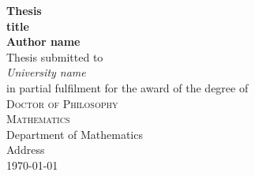\begin{titlepage}

\begin{center}
  {\huge\bfseries Thesis \\[1ex]
                  title}                  \\[6.5ex]
  {\large\bfseries Author name}           \\
  \vspace{4ex}
  Thesis  submitted to                    \\[5pt]
  \textit{University name}                \\[2cm]
  in partial fulfilment for the award of the degree of \\[2cm]
  \textsc{\Large Doctor of Philosophy}    \\[2ex]
  \textsc{\large Mathematics}             \\[12ex]
  \vfill
  Department of Mathematics               \\
  Address                                 \\
  \vfill
  \today
\end{center}
\end{titlepage}
